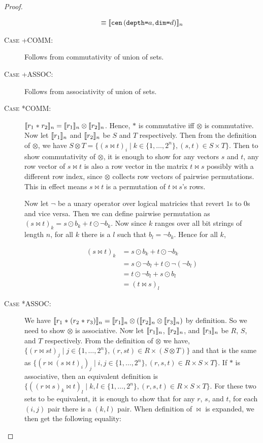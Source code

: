 \begin{proof}
\begin{description}
\begin{align*}
      \equiv & \; \llbracket{\texttt{cen} \, (\texttt{depth=}a, \texttt{dim=}d)}\rrbracket_n \\
    \end{align*}
  \item[\textsc{Case +COMM}:] Follows from commutativity of union of sets.
  \item[\textsc{Case +ASSOC}:] Follows from associativity of union of sets.
  \item[\textsc{Case *COMM}:] $\llbracket{r_1 \; \texttt{$\ast$} \; r_2}\rrbracket_n =
    \llbracket{r_1}\rrbracket_n \otimes \llbracket{r_2}\rrbracket_n$. Hence, $\texttt{$\ast$}$ is
    commutative iff $\otimes$ is commutative. Now let $\llbracket{r_1}\rrbracket_n$ and
    $\llbracket{r_2}\rrbracket_n$ be $S$ and $T$ respectively. Then from the definition of
    $\otimes$, we have $S \otimes T = \{ (s \bowtie t)_i \mid k \in
    \{ 1, \ldots, 2^n \}, (s,t) \in S \times T \}$. Then to show
    commutativity of $\otimes$, it is enough to show for any vectors $s$ and
    $t$, any row vector of $s \bowtie t$ is also a row vector in the matrix
    $t \bowtie s$ possibly with a different row index, since $\otimes$ collects
    row vectors of pairwise permutations. This in effect means $s \bowtie t$
    is a permutation of $t \bowtie s$'s rows.

    Now let $\neg$ be a unary operator over logical matricies that revert $1$s
    to $0$s and vice versa. Then we can define pairwise permutation as
    $(s \bowtie t)_k = s \odot b_k + t \odot \neg b_k$. Now since $k$ ranges
    over all bit strings of length $n$, for all $k$ there is a $l$ such that
    $b_l = \neg b_k$. Hence for all $k$,

    \begin{align*}
      (s \bowtie t)_k &= s \odot b_k + t \odot \neg b_k \\
                      &= s \odot \neg b_l + t \odot \neg (\neg b_l) \\
                      &= t \odot \neg b_l + s \odot b_l \\
                      &= (t \bowtie s)_l
    \end{align*}

  \item[\textsc{Case *ASSOC}:] We have $\llbracket{r_1 \; \texttt{$\ast$} \;
    (r_2 \; \texttt{$\ast$} \; r_3)}\rrbracket_n = \llbracket{r_1}\rrbracket_n \otimes (\llbracket{r_2}\rrbracket_n
    \otimes \llbracket{r_3}\rrbracket_n)$ by definition. So we need to show $\otimes$ is
    associative. Now let $\llbracket{r_1}\rrbracket_n$, $\llbracket{r_2}\rrbracket_n$, and
    $\llbracket{r_3}\rrbracket_n$ be $R$, $S$, and $T$ respectively. From the definition of
    $\otimes$ we have, $\{ (r \bowtie st)_j \mid j \in \{ 1, \ldots, 2^n\},
    (r, st) \in R \times (S \otimes T) \}$ and that is the same as
    $\{ (r \bowtie (s \bowtie t)_i)_j \mid i,j \in \{ 1, \ldots, 2^n \}, (r,s,t)
    \in R \times S \times T \}$. If $\ast$ is associative, then an equivalent
    definition is $\{ ((r \bowtie s)_k \bowtie t)_l \mid k,l \in \{ 1, \ldots,
    2^n \}, (r,s,t) \in R \times S \times T \}$. For these two sets to be
    equivalent, it is enough to show that for any $r$, $s$, and $t$, for each
    $(i,j)$ pair there is a $(k,l)$ pair. When definition of $\bowtie$ is
    expanded, we then get the following equality:


\end{description}
\end{proof}
